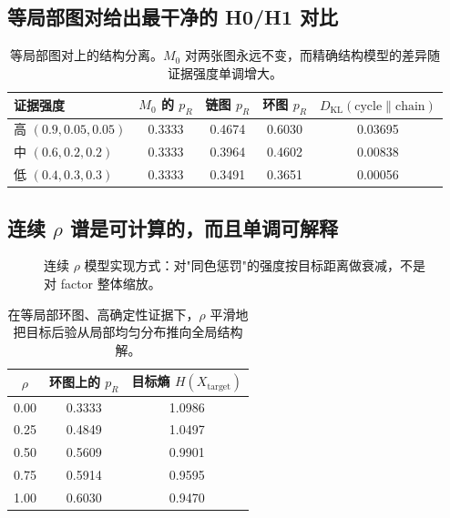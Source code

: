 \documentclass[11pt,a4paper]{ctexart}
\begin{document}
\subsection{等局部图对给出最干净的 H0/H1 对比}

\begin{table}[ht]
\centering\small
\begin{tabular}{lcccc}
\toprule
证据强度 & $M_0$ 的 $p_R$ & 链图 $p_R$ & 环图 $p_R$ & $D_{\mathrm{KL}}(\text{cycle}\|\text{chain})$ \\
\midrule
高 $(0.9,0.05,0.05)$ & 0.3333 & 0.4674 & 0.6030 & 0.03695 \\
中 $(0.6,0.2,0.2)$   & 0.3333 & 0.3964 & 0.4602 & 0.00838 \\
低 $(0.4,0.3,0.3)$   & 0.3333 & 0.3491 & 0.3651 & 0.00056 \\
\bottomrule
\end{tabular}
\caption{等局部图对上的结构分离。$M_0$ 对两张图永远不变，而精确结构模型的差异随证据强度单调增大。}
\end{table}

\subsection{连续 $\rho$ 谱是可计算的，而且单调可解释}

\begin{figure}[ht]
\centering
{}
\caption{连续 $\rho$ 模型实现方式：对"同色惩罚"的强度按目标距离做衰减，不是对 factor 整体缩放。}
\end{figure}

\begin{table}[ht]
\centering\small
\begin{tabular}{ccc}
\toprule
$\rho$ & 环图上的 $p_R$ & 目标熵 $H(X_{\mathrm{target}})$ \\
\midrule
0.00 & 0.3333 & 1.0986 \\
0.25 & 0.4849 & 1.0497 \\
0.50 & 0.5609 & 0.9901 \\
0.75 & 0.5914 & 0.9595 \\
1.00 & 0.6030 & 0.9470 \\
\bottomrule
\end{tabular}
\caption{在等局部环图、高确定性证据下，$\rho$ 平滑地把目标后验从局部均匀分布推向全局结构解。}
\end{table}
\end{document}
